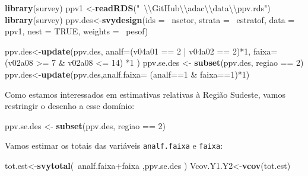 \documentclass[]{book}
\newenvironment{Shaded}{\begin{snugshade}}{\end{snugshade}}
\newcommand{\KeywordTok}[1]{\textcolor[rgb]{0.13,0.29,0.53}{\textbf{{#1}}}}
\newcommand{\DataTypeTok}[1]{\textcolor[rgb]{0.13,0.29,0.53}{{#1}}}
\newcommand{\DecValTok}[1]{\textcolor[rgb]{0.00,0.00,0.81}{{#1}}}
\newcommand{\CharTok}[1]{\textcolor[rgb]{0.31,0.60,0.02}{{#1}}}
\newcommand{\StringTok}[1]{\textcolor[rgb]{0.31,0.60,0.02}{{#1}}}
\newcommand{\OtherTok}[1]{\textcolor[rgb]{0.56,0.35,0.01}{{#1}}}
\newcommand{\NormalTok}[1]{{#1}}
\numberwithin{example}{chapter}
\numberwithin{remark}{chapter}
\numberwithin{definition}{chapter}
\begin{document}
\begin{Shaded}
\begin{Highlighting}[]
\KeywordTok{library}\NormalTok{(survey)}
\NormalTok{ppv1 <-}\KeywordTok{readRDS}\NormalTok{(}\StringTok{"~}\CharTok{\textbackslash{}\textbackslash{}}\StringTok{GitHub}\CharTok{\textbackslash{}\textbackslash{}}\StringTok{adac}\CharTok{\textbackslash{}\textbackslash{}}\StringTok{data}\CharTok{\textbackslash{}\textbackslash{}}\StringTok{ppv.rds"}\NormalTok{) }
\KeywordTok{library}\NormalTok{(survey)}
\NormalTok{ppv.des<-}\KeywordTok{svydesign}\NormalTok{(}\DataTypeTok{ids =} \NormalTok{~nsetor, }\DataTypeTok{strata =} \NormalTok{~estratof,}
\DataTypeTok{data =} \NormalTok{ppv1, }\DataTypeTok{nest =} \OtherTok{TRUE}\NormalTok{, }\DataTypeTok{weights =} \NormalTok{~pesof)}

\NormalTok{ppv.des<-}\KeywordTok{update}\NormalTok{(ppv.des,}
  \DataTypeTok{analf=}\NormalTok{(v04a01 ==}\StringTok{ }\DecValTok{2} \NormalTok{|}\StringTok{ }\NormalTok{v04a02 ==}\StringTok{ }\DecValTok{2}\NormalTok{)*}\DecValTok{1}\NormalTok{,}
  \DataTypeTok{faixa=}\NormalTok{(v02a08 >=}\StringTok{ }\DecValTok{7} \NormalTok{&}\StringTok{ }\NormalTok{v02a08 <=}\StringTok{ }\DecValTok{14}\NormalTok{) *}\DecValTok{1}
\NormalTok{)}
\NormalTok{ppv.se.des <-}\StringTok{ }\KeywordTok{subset}\NormalTok{(ppv.des, regiao ==}\StringTok{ }\DecValTok{2}\NormalTok{)}
\NormalTok{ppv.des<-}\KeywordTok{update}\NormalTok{(ppv.des,}\DataTypeTok{analf.faixa=} \NormalTok{(analf==}\DecValTok{1} \NormalTok{&}\StringTok{ }\NormalTok{faixa==}\DecValTok{1}\NormalTok{)*}\DecValTok{1}\NormalTok{)}
\end{Highlighting}
\end{Shaded}

Como estamos interessados em estimativas relativas à Região Sudeste,
vamos restringir o desenho a esse domínio:

\begin{Shaded}
\begin{Highlighting}[]
\NormalTok{ppv.se.des <-}\StringTok{ }\KeywordTok{subset}\NormalTok{(ppv.des, regiao ==}\StringTok{ }\DecValTok{2}\NormalTok{)}
\end{Highlighting}
\end{Shaded}

Vamos estimar os totais das variáveis \texttt{analf.faixa} e
\texttt{faixa}:

\begin{Shaded}
\begin{Highlighting}[]
\NormalTok{tot.est<-}\KeywordTok{svytotal}\NormalTok{(~analf.faixa+faixa ,ppv.se.des )}
\NormalTok{Vcov.Y1.Y2<-}\KeywordTok{vcov}\NormalTok{(tot.est) }
\end{Highlighting}
\end{Shaded}
\end{document}
